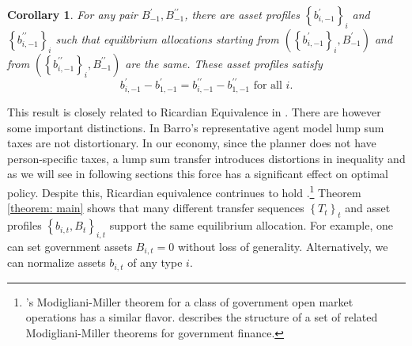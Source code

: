 \documentclass[thmsb,11pt]{article}
\newtheorem{corollary}{Corollary}
\begin{document}
\begin{corollary}
\label{corr: B does not matter} For any pair $B_{-1}^{\prime },B_{-1}^{\prime
\prime }$, there are asset profiles $\left\{ b_{i,-1}^{\prime }\right\} _{i}$ and $%
\left\{ b_{i,-1}^{\prime \prime }\right\} _{i}$ such that
equilibrium allocations starting from  $\left( \left\{ b_{i,-1}^{\prime }\right\}
_{i},B_{-1}^{\prime }\right) $ and  from  $\left( \left\{ b_{i,-1}^{\prime
\prime }\right\} _{i},B_{-1}^{\prime \prime }\right) $ are the same.
These asset profiles satisfy%
\begin{equation*}
b_{i,-1}^{\prime }-b_{1,-1}^{\prime }=b_{i,-1}^{\prime \prime
}-b_{1,-1}^{\prime \prime }\text{ for all }i.
\end{equation*}
\end{corollary}
%


%

\smallskip
This result is closely related to Ricardian Equivalence in \citet{Barro1974}. There are however some important distinctions. In Barro's representative agent model lump sum taxes are not distortionary. In our economy, since the planner does not have person-specific taxes, a lump sum transfer introduces distortions in inequality and as we will see in following sections this force has a significant effect on optimal policy. Despite this, Ricardian equivalence contrinues to hold
.\footnote{%
\citet{Wallace1981}'s Modigliani-Miller theorem for a class of government open
market operations has a similar flavor.  \citet{sargent1987dynamic} describes the
structure of a set of related Modigliani-Miller theorems for government
finance.} %
Theorem \ref{theorem: main} shows that many different transfer
sequences $\left\{ T_{t}\right\} _{t}$ and asset profiles $\left\{
b_{i,t},B_{t}\right\} _{i,t}$  support the same  equilibrium allocation.
For example, one can set government assets $B_{i,t}=0$ without loss of
generality.
Alternatively,  we can normalize  assets $b_{i,t}$ of any type $i$.
\end{document}
